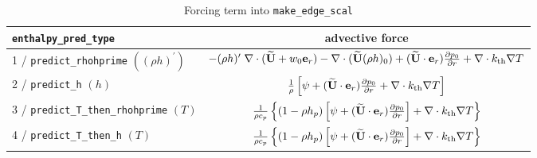 \begin{table*}[h]
\centering
\caption{Forcing term into {\tt make\_edge\_scal}}
\label{table:pred:hforce}
\renewcommand{\arraystretch}{1.5}
\begin{tabular}{l|c}
\hline
\hline
{\tt enthalpy\_pred\_type} &   {advective force} \\
\hline
1 / {\tt predict\_rhohprime} $((\rho h)^\prime)$ &  
 $-(\rho h)^\prime \; \nabla \cdot (\widetilde{{\bf U}}+w_0 \mathbf{e}_r) - 
 \nabla \cdot (\widetilde{{\bf U}} (\rho h)_0) + (\widetilde{{\bf U}} \cdot \mathbf{e}_r) \frac{\partial p_0}{\partial r} + \nabla \cdot k_{\rm th} \nabla T$ \\
2 / {\tt predict\_h}  $(h)$ & $\frac{1}{\rho} \left [\psi + (\widetilde{{\bf U}} \cdot \mathbf{e}_r)
  \frac{\partial p_0}{\partial r} + \nabla \cdot k_{\rm th} \nabla T \right ]$ \\
3 / {\tt predict\_T\_then\_rhohprime} $(T)$ & $\frac{1}{\rho c_p} \left \{ (1 - \rho h_p) 
   \left [\psi + (\widetilde{{\bf U}} \cdot \mathbf{e}_r) \frac{\partial p_0}{\partial r} \right ] + \nabla \cdot k_{\rm th} \nabla T \right \}$ \\
4 / {\tt predict\_T\_then\_h}  $(T)$ & $\frac{1}{\rho c_p} \left\{ (1 - \rho h_p) \left [\psi + (\widetilde{{\bf U}} \cdot \mathbf{e}_r)
\frac{\partial p_0}{\partial r}\right ] +  \nabla \cdot k_{\rm th} \nabla T \right\}$ \\
\hline
\end{tabular}
\end{table*}


